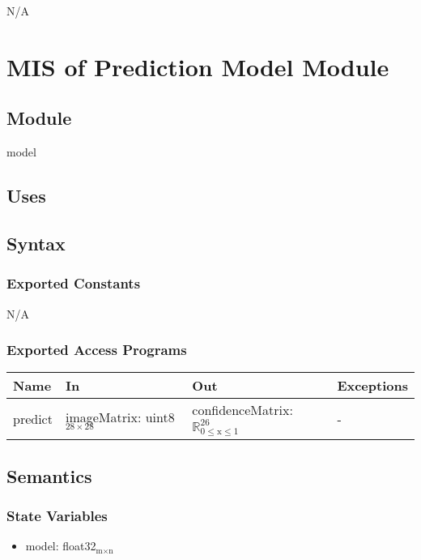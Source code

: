 \documentclass[12pt, titlepage]{article}
\begin{document}
N/A


\section{MIS of Prediction Model Module} \label{MModel}

\subsection{Module}

model

\subsection{Uses}


\subsection{Syntax}

\subsubsection{Exported Constants}

N/A

\subsubsection{Exported Access Programs}

\begin{center}
\begin{tabular}{p{2cm} p{4cm} p{4cm} p{2cm}}
\hline
\textbf{Name} & \textbf{In} & \textbf{Out} & \textbf{Exceptions} \\
\hline
predict & imageMatrix: uint8$_{28 \times 28}$ & confidenceMatrix: $\mathbb{R}_{\text{0} \leq \text{x} \leq \text{1}}^{26}$ & - \\
\hline
\end{tabular}
\end{center}

\subsection{Semantics}

\subsubsection{State Variables}

\begin{itemize}
  \item model: float32$_{\text{m} \times \text{n}}$
\end{itemize}
\end{document}
